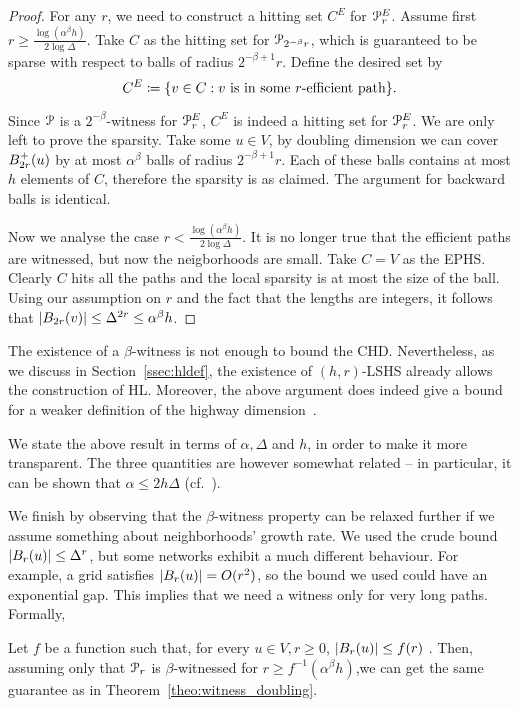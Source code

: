 \begin{proof}
For any $r$, we need to construct a hitting set $C^E$ for $\mathcal{P}_r^E$.
Assume first $r\geq \frac{\log(\alpha^\beta h)}{2\log\Delta}$.
Take $C$ as the hitting set for $\mathcal{P}_{2^{-\beta}r}$, which is guaranteed to be sparse with respect to balls of radius $2^{-\beta+1}r$.
Define the desired set by
\[
C^E\coloneqq\{v\in C: v \text{ is in some $r$-efficient path} \}.
\]

Since $\mathcal{P}$ is a $2^{-\beta}$-witness for $\mathcal{P}^E_r$, $C^E$ is indeed a hitting set for $\mathcal{P}^E_r$.
We are only left to prove the sparsity.
Take some $u\in V$, by doubling dimension we can cover $B^+_{2r}(u)$ by at most $\alpha^\beta$ balls of radius $2^{-\beta+1}r$.
Each of these balls contains at most $h$ elements of $C$, therefore the sparsity is as claimed.
The argument for backward balls is identical.

Now we analyse the case $r< \frac{\log(\alpha^\beta h)}{2\log\Delta}$.
It is no longer true that the efficient paths are witnessed, but now the neigborhoods are small.
Take $C=V$ as the EPHS.
Clearly $C$ hits all the paths and the local sparsity is at most the size of the ball.
Using our assumption on $r$ and the fact that the lengths are integers, it follows that $\lvert B_{2r}(v)\rvert\leq\Delta^{2r}\leq\alpha^\beta h$. 
\end{proof}
\begin{remark}
The existence of a $\beta$-witness is not enough to bound the CHD. Nevertheless, as we discuss in Section~\ref{ssec:hldef}, the existence of $(h,r)$-LSHS already allows the construction of HL. Moreover, the above argument does indeed give a bound for a weaker definition of the highway dimension~\cite{highway2010}.
\end{remark}
\begin{remark}
We state the above result in terms of $\alpha, \Delta$ and $h$, in order to make it more transparent. The three quantities are however somewhat related -- in particular, it can be shown that $\alpha\leq 2h\Delta$ (cf.~\cite{skeleton}).
\end{remark}

We finish by observing that the $\beta$-witness property can be relaxed further if we assume something about neighborhoods' growth rate.
We used the crude bound $\lvert B_r(u)\rvert\leq \Delta^r$, but some networks exhibit a much different behaviour.
For example, a grid satisfies  $\lvert B_r(u)\rvert=O(r^2)$, so the bound we used could have an exponential gap.
This implies that we need a witness only for very long paths.
Formally,

\begin{corollary}
Let $f$ be a function such that, for every $u\in V, r\geq 0$, $\lvert B_r(u)\rvert\leq f(r)$ .
Then, assuming only that $\mathcal{P}_r$ is $\beta$-witnessed for $r\geq f^{-1}(\alpha^\beta h)$,we can get the same guarantee as in Theorem~\ref{theo:witness_doubling}.
\end{corollary}